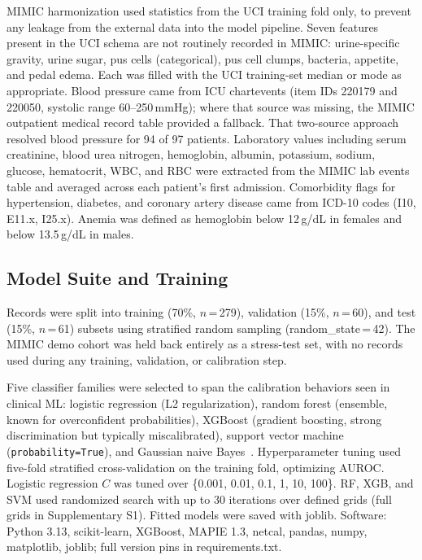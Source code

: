 MIMIC harmonization used statistics from the UCI training fold only, to prevent any leakage from the external data into the model pipeline. Seven features present in the UCI schema are not routinely recorded in MIMIC: urine-specific gravity, urine sugar, pus cells (categorical), pus cell clumps, bacteria, appetite, and pedal edema. Each was filled with the UCI training-set median or mode as appropriate. Blood pressure came from ICU chartevents (item IDs 220179 and 220050, systolic range 60--250\,mmHg); where that source was missing, the MIMIC outpatient medical record table provided a fallback. That two-source approach resolved blood pressure for 94 of 97 patients. Laboratory values including serum creatinine, blood urea nitrogen, hemoglobin, albumin, potassium, sodium, glucose, hematocrit, WBC, and RBC were extracted from the MIMIC lab events table and averaged across each patient's first admission. Comorbidity flags for hypertension, diabetes, and coronary artery disease came from ICD-10 codes (I10, E11.x, I25.x). Anemia was defined as hemoglobin below 12\,g/dL in females and below 13.5\,g/dL in males.

\subsection{Model Suite and Training}

Records were split into training (70\%, $n$\,=\,279), validation (15\%, $n$\,=\,60), and test (15\%, $n$\,=\,61) subsets using stratified random sampling (random\_state\,=\,42). The MIMIC demo cohort was held back entirely as a stress-test set, with no records used during any training, validation, or calibration step.

Five classifier families were selected to span the calibration behaviors seen in clinical ML: logistic regression (L2 regularization), random forest (ensemble, known for overconfident probabilities), XGBoost (gradient boosting, strong discrimination but typically miscalibrated), support vector machine (\texttt{probability=True}), and Gaussian naive Bayes~\cite{NiculescuMizil2005}. Hyperparameter tuning used five-fold stratified cross-validation on the training fold, optimizing AUROC. Logistic regression $C$ was tuned over \{0.001, 0.01, 0.1, 1, 10, 100\}. RF, XGB, and SVM used randomized search with up to 30 iterations over defined grids (full grids in Supplementary S1). Fitted models were saved with joblib. Software: Python 3.13, scikit-learn, XGBoost, MAPIE 1.3, netcal, pandas, numpy, matplotlib, joblib; full version pins in requirements.txt.

